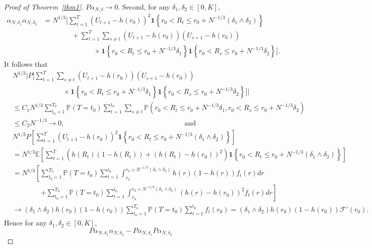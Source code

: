 \documentclass[12pt]{amsart}
\theoremstyle{plain}
\theoremstyle{remark}
\numberwithin{equation}{section}
\begin{document}
\begin{proof}[Proof of Theorem~\ref{thm1}]
$P \alpha_{N,\delta} \to 0$. Second, for any \(\delta_1,\delta_2 \in [0,K]\), 
\begin{align*}
\alpha_{N,\delta_1}\alpha_{N,\delta_2}
&= N^{1/3}\Bigg[\sum_{t=1}^{T}(U_{t+1}-h(r_0))^2\mathbf{1}\left\{r_0<R_{t}\le r_0+N^{-1/3}(\delta_1\wedge \delta_2)\right\}
\\ &\qquad \qquad + \sum_{t=1}^{T}\sum_{s\ne t}(U_{t+1}-h(r_0))(U_{s+1}-h(r_0))\\ &\hspace{3cm}\times\mathbf{1}\left\{r_0<R_{t}\le r_0+N^{-1/3}\delta_1\right\}
\mathbf{1}\left\{r_0<R_{s}\le r_0+N^{-1/3}\delta_2\right\}\Bigg].
\end{align*}
It follows that
\begin{align*}
&N^{1/3}\Bigg|P\Bigg[\sum_{t=1}^{T}\sum_{s\ne t}(U_{t+1}-h(r_0))(U_{s+1}-h(r_0))\\ &\hspace{3cm}\times\mathbf{1}\left\{r_0<R_{t}\le r_0+N^{-1/3}\delta_1\right\}
\mathbf{1}\left\{r_0<R_{s}\le r_0+N^{-1/3}\delta_2\right\}\Bigg]\Bigg|
\\ &\le C_1 N^{1/3}\sum_{t_0=1}^{T_0}\mathbb{P}(T=t_0)
\sum_{t=1}^{t_0}\sum_{s\neq t}\mathbb{P}\left(r_0<R_{t}\le r_0+N^{-1/3}\delta_1, r_0<R_{s}\le r_0+N^{-1/3}\delta_2\right)
\\ &\le C_2 N^{-1/3}\rightarrow 0, \hspace{7cm} \text{ and }
\\[.3cm]
&N^{1/3}P\left[\sum_{t=1}^{T}(U_{t+1}-h(r_0))^2\mathbf{1}\left\{r_0<R_{t}\le r_0+N^{-1/3}(\delta_1\wedge \delta_2)\right\}\right]
\\ &= N^{1/3}\mathbb{E}\left[\sum_{t=1}^{T}\left(h(R_t)(1-h(R_t))+(h(R_t)-h(r_0))^2\right)\mathbf{1}\left\{r_0<R_{t}\le r_0+N^{-1/3}(\delta_1\wedge \delta_2)\right\}\right]
\\ &= N^{1/3}\left[\sum_{t_0=1}^{T_0}\mathbb{P}(T=t_0)\sum_{t=1}^{t_0}\int_{r_0}^{r_0+N^{-1/3}(\delta_1\wedge \delta_2)}h(r)(1-h(r))f_t(r)dr\right.
\\ &\qquad \qquad\left.+\sum_{t_0=1}^{T_0}\mathbb{P}(T=t_0)\sum_{t=1}^{t_0}\int_{r_0}^{r_0+N^{-1/3}(\delta_1\wedge \delta_2)}(h(r)-h(r_0))^2f_t(r)dr\right]
\\ &\rightarrow(\delta_1\wedge \delta_2)h(r_0)(1-h(r_0))\sum_{t_0=1}^{T_0}\mathbb{P}(T=t_0)\sum_{t=1}^{t_0}f_t(r_0)=(\delta_1\wedge \delta_2)h(r_0)(1-h(r_0))\mathcal{F}'(r_0).
\end{align*}
Hence for any \(\delta_1,\delta_2 \in [0,K]\),
\[
P \alpha_{N,\delta_1} \alpha_{N,\delta_2} - P \alpha_{N,\delta_1} P \alpha_{N,\delta_2}
\]
\end{proof}
\end{document}
